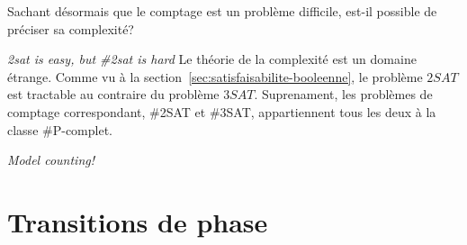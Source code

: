  Sachant désormais que le comptage est un problème difficile, est-il possible de préciser sa complexité?

\textcolor{mydarkred}{\textit{2sat is easy, but \#2sat is hard}}
Le théorie de la complexité est un domaine étrange. Comme vu à la section~\ref{sec:satisfaisabilite-booleenne}, le problème $2SAT$ est tractable au contraire du problème $3SAT$. Suprenament, les problèmes de comptage correspondant, \#2SAT et \#3SAT, appartiennent tous les deux à la classe \textsf{\#P}-complet. 

\textcolor{mydarkred}{\textit{Model counting!}}


\section{Transitions de phase}
\label{sec:transitions-de-phase}

